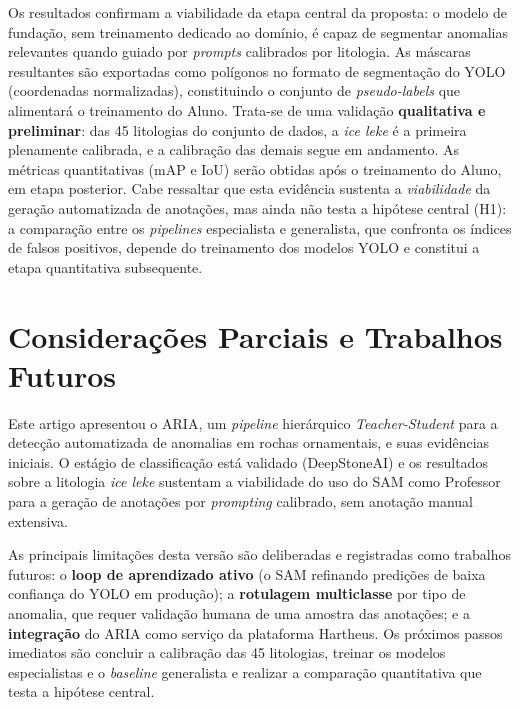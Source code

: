 \documentclass[12pt]{article}
\begin{document}
Os resultados confirmam a viabilidade da etapa central da proposta: o modelo de fundação, sem treinamento dedicado ao domínio, é capaz de segmentar anomalias relevantes quando guiado por \textit{prompts} calibrados por litologia. As máscaras resultantes são exportadas como polígonos no formato de segmentação do YOLO (coordenadas normalizadas), constituindo o conjunto de \textit{pseudo-labels} que alimentará o treinamento do Aluno. Trata-se de uma validação \textbf{qualitativa e preliminar}: das 45 litologias do conjunto de dados, a \textit{ice leke} é a primeira plenamente calibrada, e a calibração das demais segue em andamento. As métricas quantitativas (mAP e IoU) serão obtidas após o treinamento do Aluno, em etapa posterior. Cabe ressaltar que esta evidência sustenta a \textit{viabilidade} da geração automatizada de anotações, mas ainda não testa a hipótese central (H1): a comparação entre os \textit{pipelines} especialista e generalista, que confronta os índices de falsos positivos, depende do treinamento dos modelos YOLO e constitui a etapa quantitativa subsequente.

\section{Considerações Parciais e Trabalhos Futuros}
\label{sec:conclusao}

Este artigo apresentou o ARIA, um \textit{pipeline} hierárquico \textit{Teacher-Student} para a detecção automatizada de anomalias em rochas ornamentais, e suas evidências iniciais. O estágio de classificação está validado (DeepStoneAI) e os resultados sobre a litologia \textit{ice leke} sustentam a viabilidade do uso do SAM como Professor para a geração de anotações por \textit{prompting} calibrado, sem anotação manual extensiva.

As principais limitações desta versão são deliberadas e registradas como trabalhos futuros: o \textbf{loop de aprendizado ativo} (o SAM refinando predições de baixa confiança do YOLO em produção); a \textbf{rotulagem multiclasse} por tipo de anomalia, que requer validação humana de uma amostra das anotações; e a \textbf{integração} do ARIA como serviço da plataforma Hartheus. Os próximos passos imediatos são concluir a calibração das 45 litologias, treinar os modelos especialistas e o \textit{baseline} generalista e realizar a comparação quantitativa que testa a hipótese central.



\end{document}
